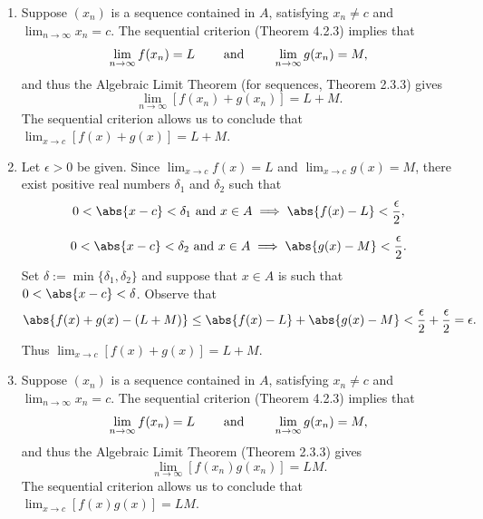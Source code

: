 \documentclass{lew98_solutions}
\begin{document}
\begin{solution}
    \begin{enumerate}
        \item Suppose \( (x_n) \) is a sequence contained in \( A \), satisfying \( x_n \neq c \) and \( \lim_{n \to \infty} x_n = c \). The sequential criterion (Theorem 4.2.3) implies that
        \[
            \lim_{n \to \infty} f(x_n) = L \hspace{8mm} \text{and} \hspace{8mm} \lim_{n \to \infty} g(x_n) = M,
        \]
        and thus the Algebraic Limit Theorem (for sequences, Theorem 2.3.3) gives
        \[
            \lim_{n \to \infty} [f(x_n) + g(x_n)] = L + M.
        \]
        The sequential criterion allows us to conclude that \( \lim_{x \to c} [f(x) + g(x)] = L + M \).

        \item Let \( \epsilon > 0 \) be given. Since \( \lim_{x \to c} f(x) = L \) and \( \lim_{x \to c} g(x) = M \), there exist positive real numbers \( \delta_1 \) and \( \delta_2 \) such that
        \begin{gather*}
            0 < \abs{x - c} < \delta_1 \text{ and } x \in A \implies \abs{f(x) - L} < \frac{\epsilon}{2}, \\[2mm]
            0 < \abs{x - c} < \delta_2 \text{ and } x \in A \implies \abs{g(x) - M} < \frac{\epsilon}{2}.
        \end{gather*}
        Set \( \delta := \min \{ \delta_1, \delta_2 \} \) and suppose that \( x \in A \) is such that \( 0 < \abs{x - c} < \delta \). Observe that
        \[
            \abs{f(x) + g(x) - (L + M)} \leq \abs{f(x) - L} + \abs{g(x) - M} < \frac{\epsilon}{2} + \frac{\epsilon}{2} = \epsilon.
        \]
        Thus \( \lim_{x \to c} [f(x) + g(x)] = L + M \).

        \item Suppose \( (x_n) \) is a sequence contained in \( A \), satisfying \( x_n \neq c \) and \( \lim_{n \to \infty} x_n = c \). The sequential criterion (Theorem 4.2.3) implies that
        \[
            \lim_{n \to \infty} f(x_n) = L \hspace{8mm} \text{and} \hspace{8mm} \lim_{n \to \infty} g(x_n) = M,
        \]
        and thus the Algebraic Limit Theorem (Theorem 2.3.3) gives
        \[
            \lim_{n \to \infty} [f(x_n) g(x_n)] = LM.
        \]
        The sequential criterion allows us to conclude that \( \lim_{x \to c} [f(x) g(x)] = LM \).


\end{enumerate}
\end{solution}
\end{document}
